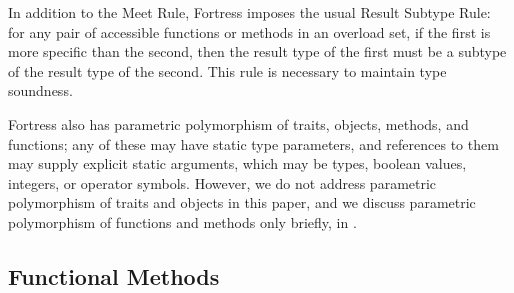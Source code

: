 In addition to the Meet Rule, Fortress imposes the usual Result Subtype Rule:
for any pair of accessible functions or methods in an overload set, if the first
is more specific than the second, then the result type of the first
must be a subtype of the result type of the second.  This rule is necessary
to maintain type soundness.

Fortress also has parametric polymorphism of traits, objects, methods, and functions;
any of these may have static type parameters, and references to them may supply explicit
static arguments, which may be types, boolean values, integers, or operator symbols.
However, we do not address parametric polymorphism of traits and objects in this paper,
and we discuss parametric polymorphism of functions and methods only
briefly, in .

\subsection{Functional Methods}

